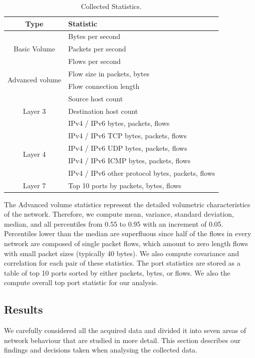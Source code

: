 \begin{table}[!t]
        \centering
        \renewcommand{\arraystretch}{1.1}
        \begin{tabular}{|c|l|} \hline
            \textbf{Type} & \textbf{Statistic} \\ \hline
            \multirow{3}{*}{Basic Volume} & Bytes per second \\
            & Packets per second \\
            & Flows per second \\ \hline
            \multirow{2}{*}{Advanced volume} & Flow size in packets, bytes \\
            & Flow connection length \\ \hline
            \multirow{3}{*}{Layer 3} & Source host count \\
            & Destination host count \\
            & IPv4 / IPv6 bytes, packets, flows \\ \hline
            \multirow{4}{*}{Layer 4} & IPv4 / IPv6 TCP bytes, packets, flows \\
            & IPv4 / IPv6 UDP bytes, packets, flows \\
            & IPv4 / IPv6 ICMP bytes, packets, flows \\
            & IPv4 / IPv6 other protocol bytes, packets, flows \\ \hline
            \multirow{1}{*}{Layer 7} & Top 10 ports by packets, bytes, flows \\
            \hline
        \end{tabular}
        \caption{Collected Statistics.}
        \label{tab:characterization-collected-statistics}
\end{table}

The Advanced volume statistics represent the detailed volumetric characteristics of the network. Therefore, we compute mean, variance, standard deviation, median, and all percentiles from 0.55 to 0.95 with an increment of 0.05. Percentiles lower than the median are superfluous since half of the flows in every network are composed of single packet flows, which amount to zero length flows with small packet sizes (typically 40 bytes). We also compute covariance and correlation for each pair of these statistics. The port statistics are stored as a table of top 10 ports sorted by either packets, bytes, or flows. We also the compute overall top port statistic for our analysis.

\subsection{Results} \label{subsec:characterization-results}
We carefully considered all the acquired data and divided it into seven areas of network behaviour that are studied in more detail. This section describes our findings and decisions taken when analysing the collected data.


